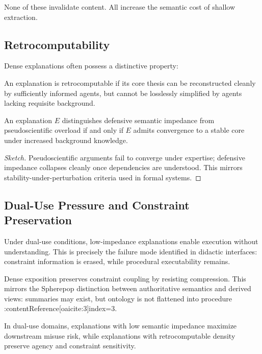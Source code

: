 None of these invalidate content. All increase the semantic cost of shallow extraction.

\subsection{Retrocomputability}

Dense explanations often possess a distinctive property:

\begin{definition}[Retrocomputability]
An explanation is retrocomputable if its core thesis can be reconstructed cleanly by sufficiently informed agents, but cannot be losslessly simplified by agents lacking requisite background.
\end{definition}

\begin{lemma}
An explanation $E$ distinguishes defensive semantic impedance from pseudoscientific overload if and only if $E$ admits convergence to a stable core under increased background knowledge.
\end{lemma}

\begin{proof}[Sketch]
Pseudoscientific arguments fail to converge under expertise; defensive impedance collapses cleanly once dependencies are understood. This mirrors stability-under-perturbation criteria used in formal systems.
\end{proof}

\subsection{Dual-Use Pressure and Constraint Preservation}

Under dual-use conditions, low-impedance explanations enable execution without understanding. This is precisely the failure mode identified in didactic interfaces: constraint information is erased, while procedural executability remains.

Dense exposition preserves constraint coupling by resisting compression. This mirrors the Spherepop distinction between authoritative semantics and derived views: summaries may exist, but ontology is not flattened into procedure :contentReference[oaicite:3]{index=3}.

\begin{theorem}
In dual-use domains, explanations with low semantic impedance maximize downstream misuse risk, while explanations with retrocomputable density preserve agency and constraint sensitivity.
\end{theorem}

